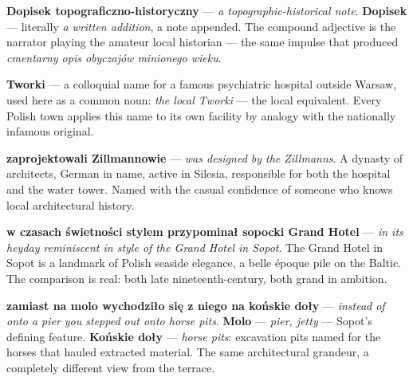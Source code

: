 
\textbf{Dopisek topograficzno-historyczny} --- \textit{a
topographic-historical note}. \textbf{Dopisek} --- literally \textit{a
written addition}, a note appended. The compound adjective is the
narrator playing the amateur local historian --- the same impulse that
produced \textit{cmentarny opis obyczajów minionego wieku}.

\textbf{Tworki} --- a colloquial name for a famous psychiatric hospital
outside Warsaw, used here as a common noun: \textit{the local Tworki}
--- the local equivalent. Every Polish town applies this name to its
own facility by analogy with the nationally infamous original.

\textbf{zaprojektowali Zillmannowie} --- \textit{was designed by the
Zillmanns}. A dynasty of architects, German in name, active in Silesia,
responsible for both the hospital and the water tower. Named with the
casual confidence of someone who knows local architectural history.

\textbf{w czasach świetności stylem przypominał sopocki Grand Hotel}
--- \textit{in its heyday reminiscent in style of the Grand Hotel in
Sopot}. The Grand Hotel in Sopot is a landmark of Polish seaside
elegance, a belle époque pile on the Baltic. The comparison is real:
both late nineteenth-century, both grand in ambition.

\textbf{zamiast na molo wychodziło się z niego na końskie doły} ---
\textit{instead of onto a pier you stepped out onto horse pits}.
\textbf{Molo} --- \textit{pier, jetty} --- Sopot's defining feature.
\textbf{Końskie doły} --- \textit{horse pits}: excavation pits named
for the horses that hauled extracted material. The same architectural
grandeur, a completely different view from the terrace.

